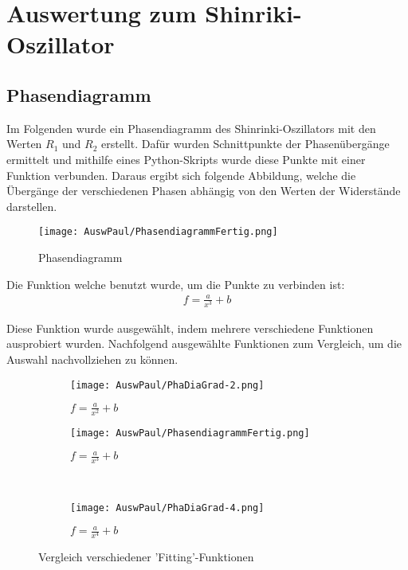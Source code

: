 \section{Auswertung zum Shinriki-Oszillator}

\subsection{Phasendiagramm}
Im Folgenden wurde ein Phasendiagramm des Shinrinki-Oszillators mit den Werten \(R_1\) und \(R_2\) erstellt. Dafür wurden Schnittpunkte der Phasenübergänge ermittelt und mithilfe eines Python-Skripts wurde diese Punkte mit einer Funktion verbunden. Daraus ergibt sich folgende Abbildung, welche die Übergänge der verschiedenen Phasen abhängig von den Werten der Widerstände darstellen.

\begin{figure}[h]
    \centering
    \texttt{[image: AuswPaul/PhasendiagrammFertig.png]}
    \label{fig:Phasendiagramm}
    \caption{Phasendiagramm}
\end{figure}

Die Funktion welche benutzt wurde, um die Punkte zu verbinden ist:
\begin{align}
    f = \frac{a}{x^3} +b
\end{align}

Diese Funktion wurde ausgewählt, indem mehrere verschiedene Funktionen ausprobiert wurden. Nachfolgend ausgewählte Funktionen zum Vergleich, um die Auswahl nachvollziehen zu können.
\begin{figure}[h]

    \centering
    
    \begin{subfigure}[b]{0.45\textwidth}
        \centering
        \texttt{[image: AuswPaul/PhaDiaGrad-2.png]}
        \caption{$f = \frac{a}{x^2} + b$}
    \end{subfigure}
    \hfill
    \begin{subfigure}[b]{0.45\textwidth}
        \centering
        \texttt{[image: AuswPaul/PhasendiagrammFertig.png]}
        \caption{$f = \frac{a}{x^3} + b$}
    \end{subfigure}
    \\
    \begin{subfigure}[b]{0.45\textwidth}
        \centering
        \texttt{[image: AuswPaul/PhaDiaGrad-4.png]}
        \caption{$f = \frac{a}{x^4} + b$}
    \end{subfigure}
    \caption{Vergleich verschiedener 'Fitting'-Funktionen}
    \label{fig:PhasenDiaVergl}
    \end{figure}

